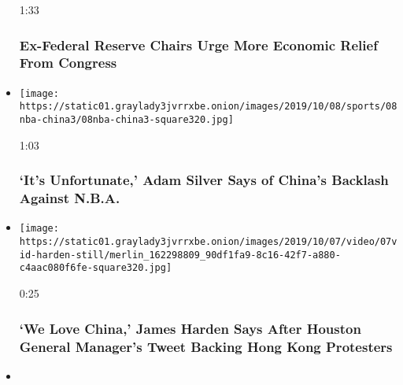 \begin{itemize}
  1:33

  \hypertarget{ex-federal-reserve-chairs-urge-more-economic-relief-from-congress}{%
  \subsubsection{Ex-Federal Reserve Chairs Urge More Economic Relief
  From
  Congress}\label{ex-federal-reserve-chairs-urge-more-economic-relief-from-congress}}
\item
  \href{https://www.nytimes3xbfgragh.onion/video/sports/basketball/100000006757507/adam-silver-china.html?action=click\&module=video-series-bar\&region=header\&pgtype=Article\&playlistId=video/business}{}

  \texttt{[image: https://static01.graylady3jvrrxbe.onion/images/2019/10/08/sports/08nba-china3/08nba-china3-square320.jpg]}

  1:03

  \hypertarget{its-unfortunate-adam-silver-says-of-chinas-backlash-against-nba}{%
  \subsubsection{`It's Unfortunate,' Adam Silver Says of China's
  Backlash Against
  N.B.A.}\label{its-unfortunate-adam-silver-says-of-chinas-backlash-against-nba}}
\item
  \href{https://www.nytimes3xbfgragh.onion/video/sports/basketball/100000006755297/james-harden-china-apology.html?action=click\&module=video-series-bar\&region=header\&pgtype=Article\&playlistId=video/business}{}

  \texttt{[image: https://static01.graylady3jvrrxbe.onion/images/2019/10/07/video/07vid-harden-still/merlin\_162298809\_90df1fa9-8c16-42f7-a880-c4aac080f6fe-square320.jpg]}

  0:25

  \hypertarget{we-love-china-james-harden-says-after-houston-general-managers-tweet-backing-hong-kong-protesters}{%
  \subsubsection{`We Love China,' James Harden Says After Houston
  General Manager's Tweet Backing Hong Kong
  Protesters}\label{we-love-china-james-harden-says-after-houston-general-managers-tweet-backing-hong-kong-protesters}}
\item
  \href{https://www.nytimes3xbfgragh.onion/video/us/100000006724792/fed-rate-cut.html?action=click\&module=video-series-bar\&region=header\&pgtype=Article\&playlistId=video/business}{}


\end{itemize}
